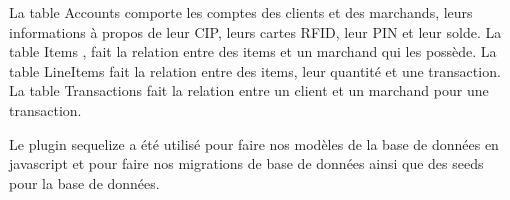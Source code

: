 		La table \og Accounts \fg{} comporte les comptes des clients et des marchands, leurs informations à propos de leur CIP, leurs cartes RFID, leur PIN et leur solde. La table \og Items \fg{}, fait la relation entre des items et un marchand qui les possède. La table \og LineItems \fg{} fait la relation entre des items, leur quantité et une transaction. La table \og Transactions \fg{} fait la relation entre un client et un marchand pour une transaction.

		Le plugin \og sequelize \fg{} a été utilisé pour faire nos modèles de la base de données en javascript et pour faire nos migrations de base de données ainsi que des \og seeds \fg{} pour la base de données.

		
		
		